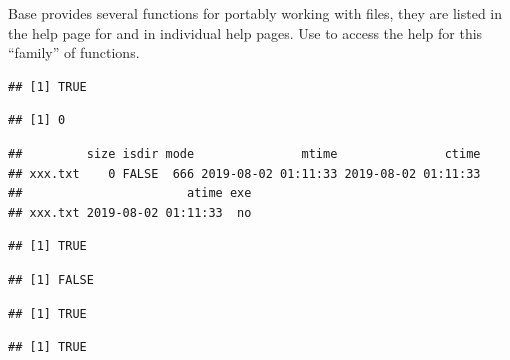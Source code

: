 \documentclass[krantz2]{krantz}\usepackage{knitr}%
\begin{document}
Base \Rlang provides several functions for portably working with files, they are listed in the help page for  and in individual help pages. Use  to access the help for this ``family'' of functions.

\begin{knitrout}\footnotesize
{}\color{fgcolor}\begin{kframe}
\begin{alltt}
 \hlstd{(}\hlopt{!}\hlstd{(}\hlstd{)) \{}
  \hlstd{(}\hlstd{)}
\hlstd{\}}
\end{alltt}
\begin{verbatim}
## [1] TRUE
\end{verbatim}
\begin{alltt}
\hlstd{(}\hlstd{)}
\end{alltt}
\begin{verbatim}
## [1] 0
\end{verbatim}
\begin{alltt}
\hlstd{(}\hlstd{)}
\end{alltt}
\begin{verbatim}
##         size isdir mode               mtime               ctime
## xxx.txt    0 FALSE  666 2019-08-02 01:11:33 2019-08-02 01:11:33
##                       atime exe
## xxx.txt 2019-08-02 01:11:33  no
\end{verbatim}
\begin{alltt}
\hlstd{(}\hlstd{,} \hlstd{)}
\end{alltt}
\begin{verbatim}
## [1] TRUE
\end{verbatim}
\begin{alltt}
\hlstd{(}\hlstd{)}
\end{alltt}
\begin{verbatim}
## [1] FALSE
\end{verbatim}
\begin{alltt}
\hlstd{(}\hlstd{)}
\end{alltt}
\begin{verbatim}
## [1] TRUE
\end{verbatim}
\begin{alltt}
\hlstd{(}\hlstd{)}
\end{alltt}
\begin{verbatim}
## [1] TRUE
\end{verbatim}
\end{kframe}
\end{knitrout}
\end{document}

